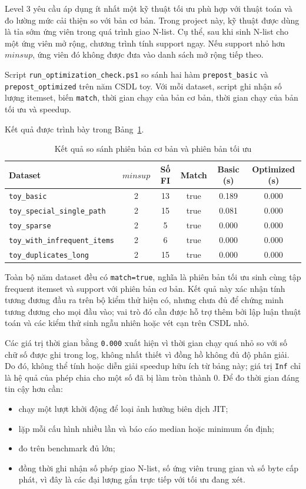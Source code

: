 Level 3 yêu cầu áp dụng ít nhất một kỹ thuật tối ưu phù hợp với thuật toán và đo lường mức cải thiện so với bản cơ bản. Trong project này, kỹ thuật được dùng là tỉa sớm ứng viên trong quá trình giao N-list. Cụ thể, sau khi sinh N-list cho một ứng viên mở rộng, chương trình tính support ngay. Nếu support nhỏ hơn $\mathit{minsup}$, ứng viên đó không được đưa vào danh sách mở rộng tiếp theo.

Script \texttt{run\_optimization\_check.ps1} so sánh hai hàm \texttt{prepost\_basic} và \texttt{prepost\_optimized} trên năm CSDL toy. Với mỗi dataset, script ghi nhận số lượng itemset, biến \texttt{match}, thời gian chạy của bản cơ bản, thời gian chạy của bản tối ưu và speedup.

Kết quả được trình bày trong Bảng~\ref{tab:optimization-check-results}.

\begin{table}[H]
\centering
\caption{Kết quả so sánh phiên bản cơ bản và phiên bản tối ưu}
\label{tab:optimization-check-results}
\begin{tabular}{lccccc}
\toprule
Dataset & $\mathit{minsup}$ & Số FI & Match & Basic (s) & Optimized (s) \\
\midrule
\texttt{toy\_basic} & 2 & 13 & true & 0.189 & 0.000 \\
\texttt{toy\_special\_single\_path} & 2 & 15 & true & 0.081 & 0.000 \\
\texttt{toy\_sparse} & 2 & 5 & true & 0.000 & 0.000 \\
\texttt{toy\_with\_infrequent\_items} & 2 & 6 & true & 0.000 & 0.000 \\
\texttt{toy\_duplicates\_long} & 2 & 15 & true & 0.000 & 0.000 \\
\bottomrule
\end{tabular}
\end{table}

Toàn bộ năm dataset đều có \texttt{match=true}, nghĩa là phiên bản tối ưu
sinh cùng tập frequent itemset và support với phiên bản cơ bản. Kết quả này xác
nhận tính tương đương đầu ra trên bộ kiểm thử hiện có, nhưng chưa đủ để chứng
minh tương đương cho mọi đầu vào; vai trò đó cần được hỗ trợ thêm bởi lập luận
thuật toán và các kiểm thử sinh ngẫu nhiên hoặc vét cạn trên CSDL nhỏ.

Các giá trị thời gian bằng \texttt{0.000} xuất hiện vì thời gian chạy quá nhỏ so
với số chữ số được ghi trong log, không nhất thiết vì đồng hồ không đủ độ phân
giải. Do đó, không thể tính hoặc diễn giải speedup hữu ích từ bảng này; giá trị
\texttt{Inf} chỉ là hệ quả của phép chia cho một số đã bị làm tròn thành 0.
Để đo thời gian đáng tin cậy hơn cần:
\begin{itemize}
    \item chạy một lượt khởi động để loại ảnh hưởng biên dịch JIT;
    \item lặp mỗi cấu hình nhiều lần và báo cáo median hoặc minimum ổn định;
    \item đo trên benchmark đủ lớn;
    \item đồng thời ghi nhận số phép giao N-list, số ứng viên trung gian và số
          byte cấp phát, vì đây là các đại lượng gắn trực tiếp với tối ưu đang xét.
\end{itemize}

